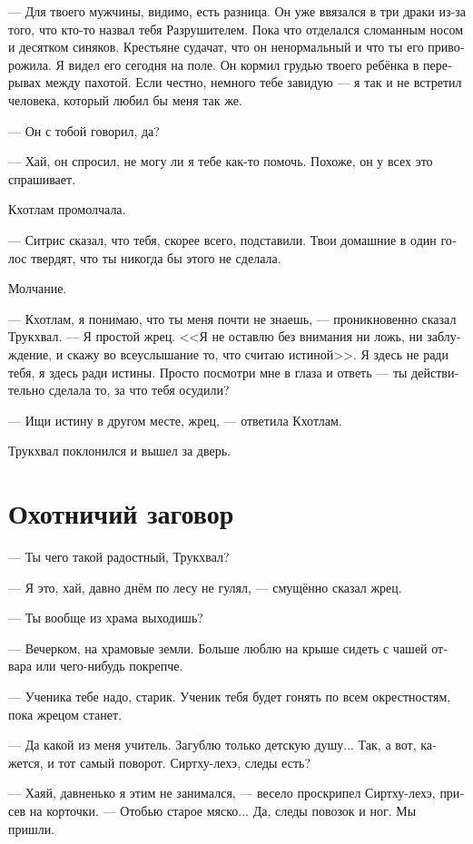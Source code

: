 \documentclass[a4paper,12pt,fleqn]{book}\usepackage{polyglossia}\setdefaultlanguage[babelshorthands=true]{russian}\setotherlanguage{english}\defaultfontfeatures{Ligatures=TeX,Mapping=tex-text}\usepackage{xcolor}\newcommand{\ml}[3]{#2}
\begin{document}
--- Для твоего мужчины, видимо, есть разница.
Он уже ввязался в три драки из-за того, что кто-то назвал тебя Разрушителем.
Пока что отделался сломанным носом и десятком синяков.
Крестьяне судачат, что он ненормальный и что ты его приворожила.
Я видел его сегодня на поле.
Он кормил грудью твоего ребёнка в перерывах между пахотой.
Если честно, немного тебе завидую --- я так и не встретил человека, который любил бы меня так же.

--- Он с тобой говорил, да?

--- Хай, он спросил, не могу ли я тебе как-то помочь.
Похоже, он у всех это спрашивает.

Кхотлам промолчала.

--- Ситрис сказал, что тебя, скорее всего, подставили.
Твои домашние в один голос твердят, что ты никогда бы этого не сделала.

Молчание.

--- Кхотлам, я понимаю, что ты меня почти не знаешь, --- проникновенно сказал Трукхвал.
--- Я простой жрец.
<<Я не оставлю без внимания ни ложь, ни заблуждение, и скажу во всеуслышание то, что считаю истиной>>.
Я здесь не ради тебя, я здесь ради истины.
Просто посмотри мне в глаза и ответь --- ты действительно сделала то, за что тебя осудили?

--- Ищи истину в другом месте, жрец, --- ответила Кхотлам.

Трукхвал поклонился и вышел за дверь.

\section{Охотничий заговор}

--- Ты чего такой радостный, Трукхвал?

--- Я это, хай, давно днём по лесу не гулял, --- смущённо сказал жрец.

--- Ты вообще из храма выходишь?

--- Вечерком, на храмовые земли.
Больше люблю на крыше сидеть с чашей отвара или чего-нибудь покрепче.

--- Ученика тебе надо, старик.
Ученик тебя будет гонять по всем окрестностям, пока жрецом станет.

--- Да какой из меня учитель.
Загублю только детскую душу...
Так, а вот, кажется, и тот самый поворот.
Сиртху-лехэ, следы есть?

--- Хаяй, давненько я этим не занимался, --- весело проскрипел Сиртху-лехэ, присев на корточки.
--- Отобью старое мяско...
Да, следы повозок и ног.
Мы пришли.
\end{document}
